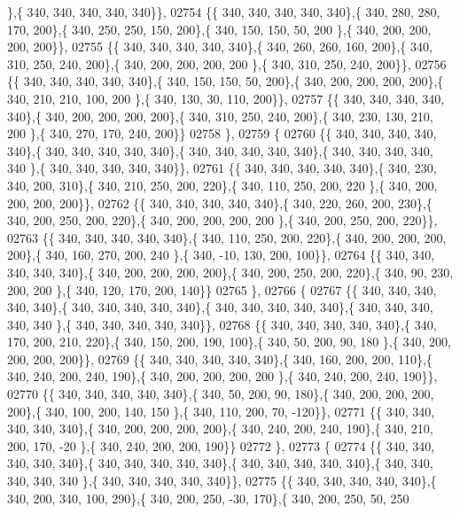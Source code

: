 \begin{DoxyCode}
      \},\{ 340, 340, 340, 340, 340\}\},
02754 \{\{ 340, 340, 340, 340, 340\},\{ 340, 280, 280, 170, 200\},\{ 340, 250, 250, 150, 200\},\{ 340, 150, 150,  50, 200
      \},\{ 340, 200, 200, 200, 200\}\},
02755 \{\{ 340, 340, 340, 340, 340\},\{ 340, 260, 260, 160, 200\},\{ 340, 310, 250, 240, 200\},\{ 340, 200, 200, 200, 200
      \},\{ 340, 310, 250, 240, 200\}\},
02756 \{\{ 340, 340, 340, 340, 340\},\{ 340, 150, 150,  50, 200\},\{ 340, 200, 200, 200, 200\},\{ 340, 210, 210, 100, 200
      \},\{ 340, 130,  30, 110, 200\}\},
02757 \{\{ 340, 340, 340, 340, 340\},\{ 340, 200, 200, 200, 200\},\{ 340, 310, 250, 240, 200\},\{ 340, 230, 130, 210, 200
      \},\{ 340, 270, 170, 240, 200\}\}
02758 \},
02759 \{
02760 \{\{ 340, 340, 340, 340, 340\},\{ 340, 340, 340, 340, 340\},\{ 340, 340, 340, 340, 340\},\{ 340, 340, 340, 340, 340
      \},\{ 340, 340, 340, 340, 340\}\},
02761 \{\{ 340, 340, 340, 340, 340\},\{ 340, 230, 340, 200, 310\},\{ 340, 210, 250, 200, 220\},\{ 340, 110, 250, 200, 220
      \},\{ 340, 200, 200, 200, 200\}\},
02762 \{\{ 340, 340, 340, 340, 340\},\{ 340, 220, 260, 200, 230\},\{ 340, 200, 250, 200, 220\},\{ 340, 200, 200, 200, 200
      \},\{ 340, 200, 250, 200, 220\}\},
02763 \{\{ 340, 340, 340, 340, 340\},\{ 340, 110, 250, 200, 220\},\{ 340, 200, 200, 200, 200\},\{ 340, 160, 270, 200, 240
      \},\{ 340, -10, 130, 200, 100\}\},
02764 \{\{ 340, 340, 340, 340, 340\},\{ 340, 200, 200, 200, 200\},\{ 340, 200, 250, 200, 220\},\{ 340,  90, 230, 200, 200
      \},\{ 340, 120, 170, 200, 140\}\}
02765 \},
02766 \{
02767 \{\{ 340, 340, 340, 340, 340\},\{ 340, 340, 340, 340, 340\},\{ 340, 340, 340, 340, 340\},\{ 340, 340, 340, 340, 340
      \},\{ 340, 340, 340, 340, 340\}\},
02768 \{\{ 340, 340, 340, 340, 340\},\{ 340, 170, 200, 210, 220\},\{ 340, 150, 200, 190, 100\},\{ 340,  50, 200,  90, 180
      \},\{ 340, 200, 200, 200, 200\}\},
02769 \{\{ 340, 340, 340, 340, 340\},\{ 340, 160, 200, 200, 110\},\{ 340, 240, 200, 240, 190\},\{ 340, 200, 200, 200, 200
      \},\{ 340, 240, 200, 240, 190\}\},
02770 \{\{ 340, 340, 340, 340, 340\},\{ 340,  50, 200,  90, 180\},\{ 340, 200, 200, 200, 200\},\{ 340, 100, 200, 140, 150
      \},\{ 340, 110, 200,  70, -120\}\},
02771 \{\{ 340, 340, 340, 340, 340\},\{ 340, 200, 200, 200, 200\},\{ 340, 240, 200, 240, 190\},\{ 340, 210, 200, 170, -20
      \},\{ 340, 240, 200, 200, 190\}\}
02772 \},
02773 \{
02774 \{\{ 340, 340, 340, 340, 340\},\{ 340, 340, 340, 340, 340\},\{ 340, 340, 340, 340, 340\},\{ 340, 340, 340, 340, 340
      \},\{ 340, 340, 340, 340, 340\}\},
02775 \{\{ 340, 340, 340, 340, 340\},\{ 340, 200, 340, 100, 290\},\{ 340, 200, 250, -30, 170\},\{ 340, 200, 250,  50, 250

\end{DoxyCode}
